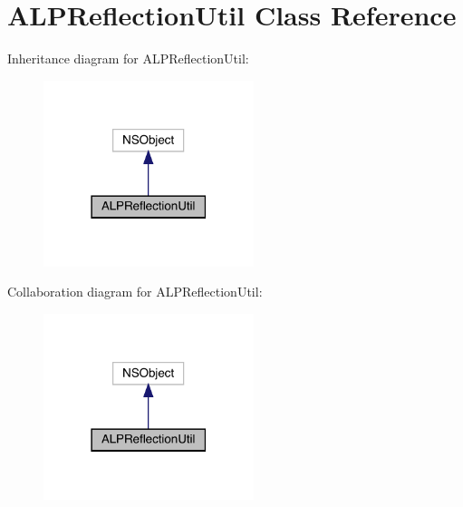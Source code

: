 \hypertarget{interface_a_l_p_reflection_util}{}\section{A\+L\+P\+Reflection\+Util Class Reference}
\label{interface_a_l_p_reflection_util}


Inheritance diagram for A\+L\+P\+Reflection\+Util\+:\nopagebreak
\begin{figure}[H]
\begin{center}
\leavevmode
\includegraphics[width=174pt]{interface_a_l_p_reflection_util__inherit__graph}
\end{center}
\end{figure}


Collaboration diagram for A\+L\+P\+Reflection\+Util\+:\nopagebreak
\begin{figure}[H]
\begin{center}
\leavevmode
\includegraphics[width=174pt]{interface_a_l_p_reflection_util__coll__graph}
\end{center}
\end{figure}
